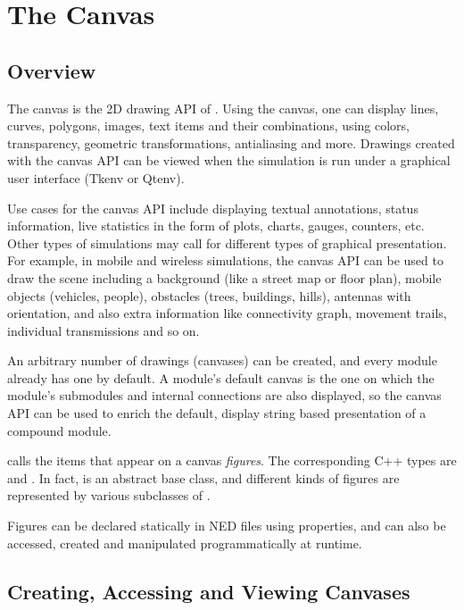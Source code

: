 \section{The Canvas}
\label{sec:ch-graphics:canvas}

\subsection{Overview}

The canvas is the 2D drawing API of {\opp}. Using the canvas, one can
display lines, curves, polygons, images, text items and their combinations,
using colors, transparency, geometric transformations, antialiasing and
more. Drawings created with the canvas API can be viewed when the simulation
is run under a graphical user interface (Tkenv or Qtenv).

Use cases for the canvas API include displaying textual annotations,
status information, live statistics in the form of plots, charts, gauges,
counters, etc. Other types of simulations may call for different types of
graphical presentation. For example, in mobile and wireless simulations,
the canvas API can be used to draw the scene including a background (like a
street map or floor plan), mobile objects (vehicles, people), obstacles
(trees, buildings, hills), antennas with orientation, and also extra
information like connectivity graph, movement trails, individual
transmissions and so on.

An arbitrary number of drawings (canvases) can be created, and every module
already has one by default. A module's default canvas is the one on which
the module's submodules and internal connections are also displayed, so the
canvas API can be used to enrich the default, display string based
presentation of a compound module.

{\opp} calls the items that appear on a canvas \textit{figures}. The
corresponding C++ types are  and . In fact,
 is an abstract base class, and different kinds of figures
are represented by various subclasses of .

Figures can be declared statically in NED files using 
properties, and can also be accessed, created and manipulated
programmatically at runtime.


\subsection{Creating, Accessing and Viewing Canvases}

